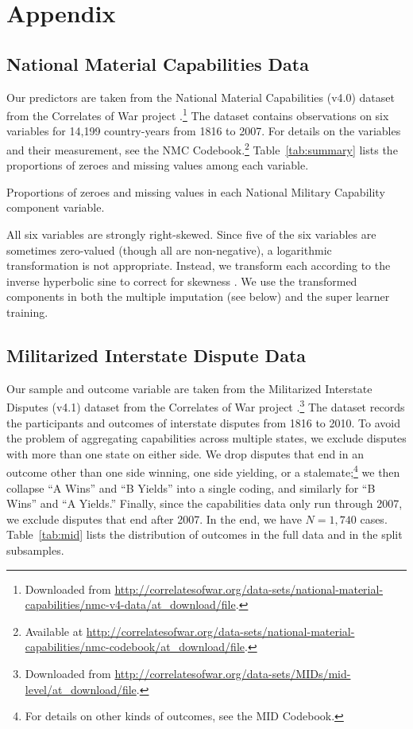 \section{Appendix}

\subsection{National Material Capabilities Data}

Our predictors are taken from the National Material Capabilities (v4.0) dataset from the Correlates of War project \citep{singer1972}.\footnote{
  Downloaded from \url{http://correlatesofwar.org/data-sets/national-material-capabilities/nmc-v4-data/at_download/file}.
}
The dataset contains observations on six variables for 14,199 country-years from 1816 to 2007.
For details on the variables and their measurement, see the NMC Codebook.\footnote{
  Available at \url{http://correlatesofwar.org/data-sets/national-material-capabilities/nmc-codebook/at_download/file}.
}
Table~\ref{tab:summary} lists the proportions of zeroes and missing values among each variable.

\begin{table}[htp]
  \centering
  
  \caption{
    Proportions of zeroes and missing values in each National Military Capability component variable.
  }
  \label{tab:summary}
\end{table}

All six variables are strongly right-skewed.
Since five of the six variables are sometimes zero-valued (though all are non-negative), a logarithmic transformation is not appropriate.
Instead, we transform each according to the inverse hyperbolic sine to correct for skewness \citep{Burbidge:1988gu}.
We use the transformed components in both the multiple imputation (see below) and the super learner training.

\subsection{Militarized Interstate Dispute Data}

Our sample and outcome variable are taken from the Militarized Interstate Disputes (v4.1) dataset from the Correlates of War project \citep{Palmer:2015hp}.\footnote{
  Downloaded from \url{http://correlatesofwar.org/data-sets/MIDs/mid-level/at_download/file}.
}
The dataset records the participants and outcomes of interstate disputes from 1816 to 2010.
To avoid the problem of aggregating capabilities across multiple states, we exclude disputes with more than one state on either side.
We drop disputes that end in an outcome other than one side winning, one side yielding, or a stalemate;\footnote{
  For details on other kinds of outcomes, see the MID Codebook.
}
we then collapse ``A Wins'' and ``B Yields'' into a single coding, and similarly for ``B Wins'' and ``A Yields.''
Finally, since the capabilities data only run through 2007, we exclude disputes that end after 2007.
In the end, we have $N = 1{,}740$ cases.
Table~\ref{tab:mid} lists the distribution of outcomes in the full data and in the split subsamples.

